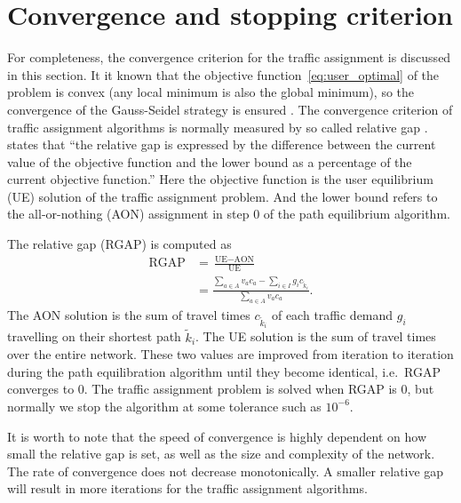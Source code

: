 \section{Convergence and stopping criterion} \label{sec:convergence}
For completeness, the convergence criterion for the traffic assignment is discussed in this section.
It it known that the objective function~\eqref{eq:user_optimal} of the problem is convex (any local minimum is also the global minimum),
so the convergence of the Gauss-Seidel strategy is ensured \citep{Florian2008}.
The convergence criterion of traffic assignment algorithms is normally measured by so called relative gap \citep{Rose}.
\cite{Rose} states that ``the relative gap is expressed by the difference between the current value of 
the objective function and the lower bound as a percentage of the current objective function.''
Here the objective function is the user equilibrium (UE) solution of the traffic assignment problem.
And the lower bound refers to the all-or-nothing (AON) assignment in step 0 of the path equilibrium algorithm.

The relative gap (RGAP) is computed as
\begin{align}
    \text{RGAP} &= \frac{\text{UE} - \text{AON}}{\text{UE}} \\
    &= \frac{\sum_{a \in A} v_a c_a - \sum_{i \in I} g_i c_{\tilde{k}_i}}{\sum_{a \in A} v_a c_a}.
\end{align}
The AON solution is the sum of travel times $c_{\tilde{k}_i}$ of each traffic demand $g_i$ travelling on their shortest path $\tilde{k}_i$.
The UE solution is the sum of travel times over the entire network.
These two values are improved from iteration to iteration during the path equilibration algorithm until they become identical, i.e.\ RGAP converges to 0.
The traffic assignment problem is solved when RGAP is 0,
but normally we stop the algorithm at some tolerance such as $10^{-6}$.

It is worth to note that the speed of convergence is highly dependent on how small the relative gap is set,
as well as the size and complexity of the network.
The rate of convergence does not decrease monotonically. 
A smaller relative gap will result in more iterations for the traffic assignment algorithms.
